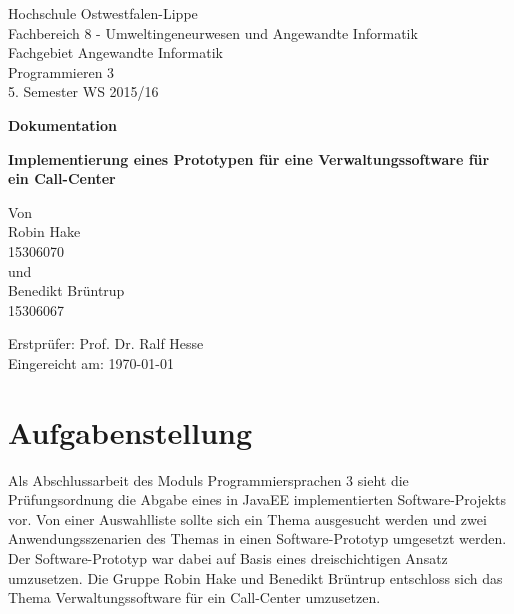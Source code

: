 \documentclass[12pt, a4paper]{article}
\begin{document}
\begin{titlepage}
Hochschule Ostwestfalen-Lippe \\
Fachbereich 8 - Umweltingeneurwesen und Angewandte Informatik \\
Fachgebiet Angewandte Informatik \\
Programmieren 3 \\
5. Semester WS 2015/16\\
\vspace{2cm}

\begin{center}
\begin{Large}
\textbf{Dokumentation} \\
\end{Large}
\vspace{2cm}

\begin{Large}
\textbf {Implementierung eines Prototypen für eine Verwaltungssoftware für ein Call-Center} \\[0.35cm]
\end{Large}
Von \\[0.35cm]
Robin Hake \\
15306070 \\[0.35cm]
und\\[0.35cm]
Benedikt Brüntrup \\
15306067 \\[0.35cm]
\end{center}

\vfill
Erstprüfer: Prof. Dr. Ralf Hesse \\
Eingereicht am: {\today}
\end{titlepage}

\newpage
\tableofcontents


\vfill
\newpage


\section{Aufgabenstellung}
Als Abschlussarbeit des Moduls \glqq Programmiersprachen 3\grqq{} sieht die Prüfungsordnung die Abgabe eines in JavaEE implementierten Software-Projekts vor. Von einer Auswahlliste sollte sich ein Thema ausgesucht werden und zwei Anwendungsszenarien des Themas in einen Software-Prototyp umgesetzt werden. Der Software-Prototyp war dabei auf Basis eines dreischichtigen Ansatz umzusetzen.  Die Gruppe Robin Hake und Benedikt Brüntrup entschloss sich das Thema \glqq Verwaltungssoftware für ein Call-Center\grqq{} umzusetzen.
\end{document}
